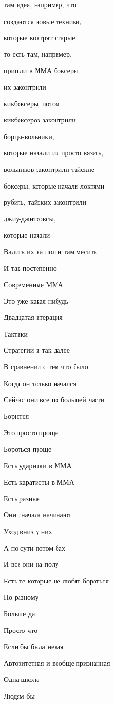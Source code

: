 там идея, например, что

создаются новые техники,

которые контрят старые,

то есть там, например,

пришли в ММА боксеры,

их законтрили

кикбоксеры, потом

кикбоксеров законтрили

борцы-вольники,

которые начали их просто вязать,

вольников законтрили тайские

боксеры, которые начали локтями

рубить, тайских законтрили

джиу-джитсовсы,

которые начали

Валить их на пол и там месить

И так постепенно

Современные ММА

Это уже какая-нибудь

Двадцатая итерация

Тактики

Стратегии и так далее

В сравнении с тем что было

Когда он только начался

Сейчас они все по большей части

Борются

Это просто проще

Бороться проще

Есть ударники в ММА

Есть каратисты в ММА

Есть разные

Они сначала начинают

Уход вниз у них

А по сути потом бах

И все они на полу

Есть те которые не любят бороться

По разному

Больше да

Просто что

Если бы была некая

Авторитетная и вообще признанная

Одна школа

Людям бы

